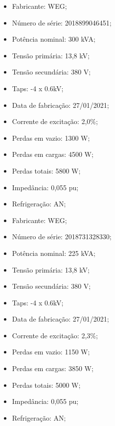 \begin{itemize}

    \item Fabricante: WEG;
    \item Número de série: 2018899046451;
    \item Potência nominal: 300 kVA;
    \item Tensão primária: 13,8 kV;
    \item Tensão secundária: 380 V;
    \item Taps: -4 x 0.6kV;
    \item Data de fabricação: 27/01/2021;
    \item Corrente de excitação: 2,0\%;
    \item Perdas em vazio: 1300 W;
    \item Perdas em cargas: 4500 W;
    \item Perdas totais: 5800 W;
    \item Impedância: 0,055 pu;
    \item Refrigeração: AN;
\end{itemize}

\begin{itemize}

    \item Fabricante: WEG;
    \item Número de série: 2018731328330;
    \item Potência nominal: 225 kVA;
    \item Tensão primária: 13,8 kV;
    \item Tensão secundária: 380 V;
    \item Taps: -4 x 0.6kV;
    \item Data de fabricação: 27/01/2021;
    \item Corrente de excitação: 2,3\%;
    \item Perdas em vazio: 1150 W;
    \item Perdas em cargas: 3850 W;
    \item Perdas totais: 5000 W;
    \item Impedância: 0,055 pu;
    \item Refrigeração: AN;
\end{itemize}

